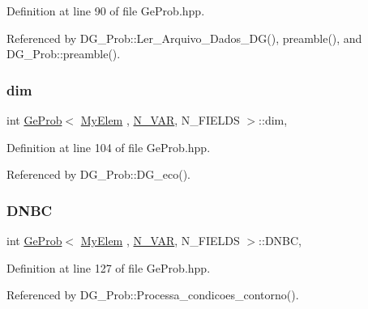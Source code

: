 Definition at line 90 of file Ge\+Prob.\+hpp.



Referenced by D\+G\+\_\+\+Prob\+::\+Ler\+\_\+\+Arquivo\+\_\+\+Dados\+\_\+\+D\+G(), preamble(), and D\+G\+\_\+\+Prob\+::preamble().

\mbox{\label{classGeProb_a122f6dbb7e9a60a35f257ae369a57f77}} 
\subsubsection{\texorpdfstring{dim}{dim}}
{\footnotesize\ttfamily int \hyperlink{classGeProb}{Ge\+Prob}$<$ \hyperlink{DG__Prob_8h_a83cd887ced9a6587428f267e50cd4787}{My\+Elem} , \hyperlink{classED__Prob_a4e7d2ff1a8e435e336fb00c527224b5a}{N\+\_\+\+V\+AR}, N\+\_\+\+F\+I\+E\+L\+DS $>$\+::dim\hspace{0.3cm}{\ttfamily [protected]}, {\ttfamily [inherited]}}



Definition at line 104 of file Ge\+Prob.\+hpp.



Referenced by D\+G\+\_\+\+Prob\+::\+D\+G\+\_\+eco().

\mbox{\label{classGeProb_a416b1ac091d91a8959a4ff2518948466}} 
\subsubsection{\texorpdfstring{D\+N\+BC}{DNBC}}
{\footnotesize\ttfamily int \hyperlink{classGeProb}{Ge\+Prob}$<$ \hyperlink{DG__Prob_8h_a83cd887ced9a6587428f267e50cd4787}{My\+Elem} , \hyperlink{classED__Prob_a4e7d2ff1a8e435e336fb00c527224b5a}{N\+\_\+\+V\+AR}, N\+\_\+\+F\+I\+E\+L\+DS $>$\+::D\+N\+BC\hspace{0.3cm}{\ttfamily [protected]}, {\ttfamily [inherited]}}



Definition at line 127 of file Ge\+Prob.\+hpp.



Referenced by D\+G\+\_\+\+Prob\+::\+Processa\+\_\+condicoes\+\_\+contorno().

\mbox{\label{classGeProb_ac32127758c84295eb361466cf37afcac}} 
